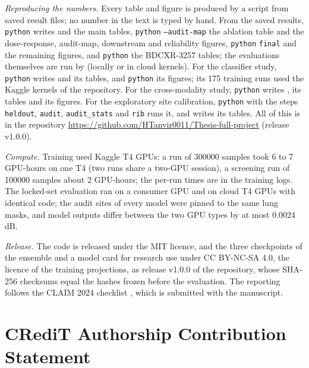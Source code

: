 \emph{Reproducing the numbers.} Every table and figure is produced by a script from saved result files; no number in the text is typed by
hand. From the saved results, \texttt{python}  writes  and the main tables,
\texttt{python}  \texttt{--audit-map} the ablation table and the dose-response, audit-map, downstream and
reliability figures, \texttt{python}  \texttt{final} and  the remaining
figures, and \texttt{python}  the BDCXR-3257 tables; the evaluations themselves are run by
 (locally or in cloud kernels). For the classifier study, \texttt{python}  writes
 and its tables, and \texttt{python}  its figures; its 175
training runs used the Kaggle kernels of the repository. For the cross-modality study, \texttt{python}  writes
,  its tables and  its figures. For the exploratory site
calibration, \texttt{python}  with the steps \texttt{heldout}, \texttt{audit}, \texttt{audit\_stats} and
\texttt{rib} runs it, and  writes its tables. All of this is in the repository
\url{https://github.com/HTanvir0011/Thesis-full-project} (release v1.0.0).

\emph{Compute.} Training used Kaggle T4 GPUs: a run of \num{300000} samples took 6 to 7 GPU-hours on one T4 (two runs share a two-GPU
session), a screening run of \num{100000} samples about 2 GPU-hours; the per-run times are in the training logs. The locked-set evaluation
ran on a consumer GPU and on cloud T4 GPUs with identical code; the audit sites of every model were pinned to the same lung masks, and model
outputs differ between the two GPU types by at most 0.0024\,dB.

\emph{Release.} The code is released under the MIT licence, and the three checkpoints of the ensemble and a model card for research use
under CC BY-NC-SA 4.0, the licence of the training projections, as release v1.0.0 of the repository, whose SHA-256 checksums equal the hashes
frozen before the evaluation. The reporting follows the
CLAIM 2024 checklist \cite{tejani2024claim}, which is submitted with the manuscript.

\section*{CRediT Authorship Contribution Statement}

